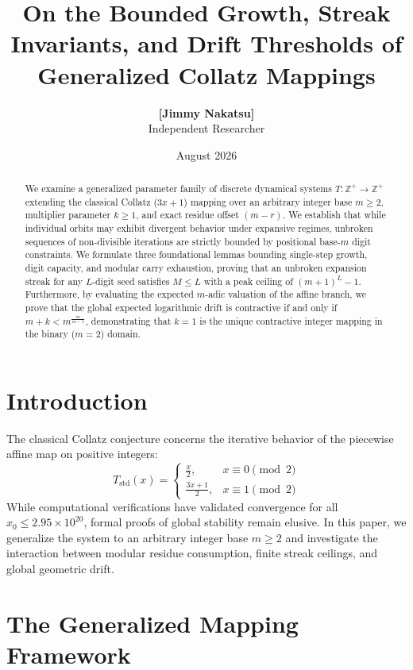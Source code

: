 \documentclass[11pt,a4paper]{article}
\title{\textbf{On the Bounded Growth, Streak Invariants, and Drift Thresholds of Generalized Collatz Mappings}}
\author{\textbf{[Jimmy Nakatsu]} \\ \small Independent Researcher}
\date{August 2026}
\theoremstyle{plain}
\theoremstyle{definition}
\begin{document}
\maketitle

\begin{abstract}
We examine a generalized parameter family of discrete dynamical systems $T: \mathbb{Z}^+ \to \mathbb{Z}^+$ extending the classical Collatz ($3x+1$) mapping over an arbitrary integer base $m \ge 2$, multiplier parameter $k \ge 1$, and exact residue offset $(m - r)$. We establish that while individual orbits may exhibit divergent behavior under expansive regimes, unbroken sequences of non-divisible iterations are strictly bounded by positional base-$m$ digit constraints. We formulate three foundational lemmas bounding single-step growth, digit capacity, and modular carry exhaustion, proving that an unbroken expansion streak for any $L$-digit seed satisfies $M \le L$ with a peak ceiling of $(m+1)^L - 1$. Furthermore, by evaluating the expected $m$-adic valuation of the affine branch, we prove that the global expected logarithmic drift is contractive if and only if $m + k < m^{\frac{m}{m-1}}$, demonstrating that $k=1$ is the unique contractive integer mapping in the binary ($m=2$) domain.
\end{abstract}

\section{Introduction}
The classical Collatz conjecture concerns the iterative behavior of the piecewise affine map on positive integers:
\begin{equation}
T_{\text{std}}(x) = \begin{cases} 
\frac{x}{2}, & x \equiv 0 \pmod 2 \\[4pt]
\frac{3x+1}{2}, & x \equiv 1 \pmod 2
\end{cases}
\end{equation}
While computational verifications have validated convergence for all $x_0 \le 2.95 \times 10^{20}$, formal proofs of global stability remain elusive. In this paper, we generalize the system to an arbitrary integer base $m \ge 2$ and investigate the interaction between modular residue consumption, finite streak ceilings, and global geometric drift.

\section{The Generalized Mapping Framework}
\end{document}
